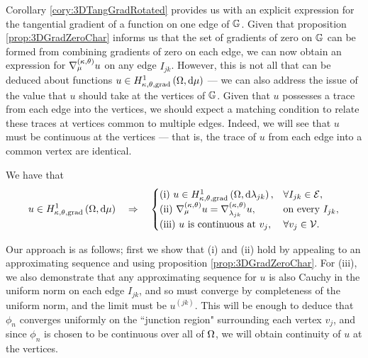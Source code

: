 Corollary \ref{cory:3DTangGradRotated} provides us with an explicit expression for the tangential gradient of a function on one edge of $\mathbb{G}$.
Given that proposition \ref{prop:3DGradZeroChar} informs us that the set of gradients of zero on $\mathbb{G}$ can be formed from combining gradients of zero on each edge, we can now obtain an expression for $\nabla^{\left( \kappa, \theta \right)}_{\mu}u$ on any edge $I_{jk}$.
However, this is not all that can be deduced about functions $u\in H^1_{\kappa,\theta,\mathrm{grad}}\left( \Omega, \mathrm{d}\mu \right)$ --- we can also address the issue of the value that $u$ should take at the vertices of $\mathbb{G}$.
Given that $u$ possesses a trace from each edge into the vertices, we should expect a matching condition to relate these traces at vertices common to multiple edges.
Indeed, we will see that $u$ must be continuous at the vertices --- that is, the trace of $u$ from each edge into a common vertex are identical.
\begin{theorem} \label{thm:3DTangGradGraph}
	We have that
	\begin{align*}
		u\in H^1_{\kappa,\theta,\mathrm{grad}}\left( \Omega, \mathrm{d}\mu \right) \quad\Rightarrow\quad
		\begin{cases}
			\mathrm{(i)} \ u\in H^1_{\kappa,\theta,\mathrm{grad}}\left( \Omega, \mathrm{d}\lambda_{jk} \right), & \forall I_{jk}\in\mathcal{E}, \\
			\mathrm{(ii)} \ \nabla^{\left( \kappa, \theta \right)}_{\mu}u = \nabla^{\left( \kappa, \theta \right)}_{\lambda_{jk}}u, & \text{on every } I_{jk}, \\
			\mathrm{(iii)} \ u \text{ is continuous at } v_j, & \forall v_j\in\mathcal{V}.
		\end{cases}
	\end{align*}
\end{theorem}
Our approach is as follows; first we show that (i) and (ii) hold by appealing to an approximating sequence and using proposition \ref{prop:3DGradZeroChar}.
For (iii), we also demonstrate that any approximating sequence for $u$ is also Cauchy in the uniform norm on each edge $I_{jk}$, and so must converge by completeness of the uniform norm, and the limit must be $u^{(jk)}$.
This will be enough to deduce that $\phi_n$ converges uniformly on the ``junction region" surrounding each vertex $v_j$, and since $\phi_n$ is chosen to be continuous over all of $\Omega$, we will obtain continuity of $u$ at the vertices.
